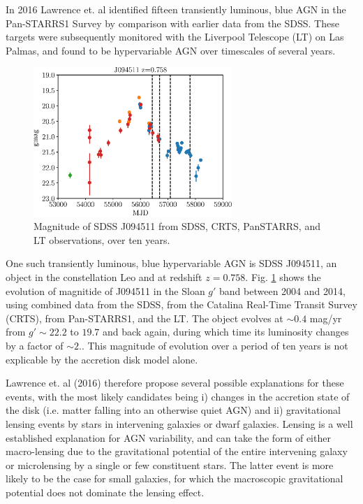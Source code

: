 \documentclass[a4paper,11pt]{article}
\begin{document}
In 2016 Lawrence et. al identified fifteen transiently luminous, blue AGN in the Pan-STARRS1 Survey by comparison with earlier data from the SDSS. These targets were subsequently monitored with the Liverpool Telescope (LT) on Las Palmas, and found to be hypervariable AGN over timescales of several years.\cite{lawrence_2016}

\begin{figure}[h!]
    \centering
    \includegraphics[width=0.67\textwidth]{J094511_magnitudes.eps}
    \caption{Magnitude of SDSS J094511 from SDSS, CRTS, PanSTARRS, and LT observations, over ten years.}
    \label{fig:magplot}
\end{figure}

One such transiently luminous, blue hypervariable AGN is SDSS J094511, an object in the constellation Leo and at redshift $z=0.758$.\cite{lawrence_2016}\cite{bruce_2017} Fig. \ref{fig:magplot} shows the evolution of magnitide of J094511 in the Sloan $g'$ band between 2004 and 2014, using combined data from the SDSS, from the Catalina Real-Time Transit Survey (CRTS), from Pan-STARRS1, and the LT. The object evolves at $\sim 0.4 $ mag/yr from $g' \sim 22.2$ to $19.7$ and back again, during which time its luminosity changes by a factor of $\sim 2$.\cite{bruce_2017}. This magnitude of evolution over a period of ten years is not explicable by the accretion disk model alone.

Lawrence et. al (2016) therefore propose several possible explanations for these events, with the most likely candidates being i) changes in the accretion state of the disk (i.e. matter falling into an otherwise quiet AGN) and ii) gravitational lensing events by stars in intervening galaxies or dwarf galaxies.\cite{lawrence_2016} Lensing is a well established explanation for AGN variability, and can take the form of either macro-lensing due to the gravitational potential of the entire intervening galaxy or microlensing by a single or few constituent stars. The latter event is more likely to be the case for small galaxies, for which the macroscopic gravitational potential does not dominate the lensing effect.\cite{lawrence_2016}
\end{document}
